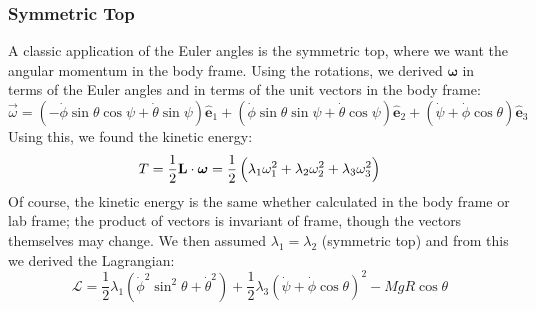 \subsubsection{Symmetric Top}
A classic application of the Euler angles is the symmetric top, where we want the angular momentum in the body frame. Using the rotations, we derived $\bm{\omega}$ in terms of the Euler angles and in terms of the unit vectors in the body frame:
\[
\vec{\omega}=(-\dot{\phi} \sin \theta \cos \psi+\dot{\theta} \sin \psi) \hat{\mathbf{e}}_{1}+(\dot{\phi} \sin \theta \sin \psi+\dot{\theta} \cos \psi) \hat{\mathbf{e}}_{2}+(\dot{\psi}+\dot{\phi} \cos \theta) \hat{\mathbf{e}}_{3}
\]
Using this, we found the kinetic energy:
\[
T=\frac{1}{2} \mathbf{L} \cdot \bm{\omega}=\frac{1}{2}\left(\lambda_{1} \omega_{1}^{2}+\lambda_{2} \omega_{2}^{2}+\lambda_{3} \omega_{3}^{2}\right)
\]
Of course, the kinetic energy is the same whether calculated in the body frame or lab frame; the product of vectors is invariant of frame, though the vectors themselves may change. We then assumed $\lambda_1 = \lambda_2$ (symmetric top) and from this we derived the Lagrangian:
\[
\mathcal{L}=\frac{1}{2} \lambda_{1}\left(\dot{\phi}^{2} \sin ^{2} \theta+\dot{\theta}^{2}\right)+\frac{1}{2} \lambda_{3}(\dot{\psi}+\dot{\phi} \cos \theta)^{2}-M g R \cos \theta
\]

